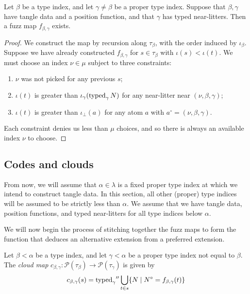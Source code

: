 \begin{proposition}
    Let \( \beta \) be a type index, and let \( \gamma \neq \beta \) be a proper type index.
    Suppose that \( \beta, \gamma \) have tangle data and a position function, and that \( \gamma \) has typed near-litters.
    Then a fuzz map \( f_{\beta,\gamma} \) exists.
\end{proposition}
\begin{proof}
    We construct the map by recursion along \( \tau_\beta \), with the order induced by \( \iota_\beta \).
    Suppose we have already constructed \( f_{\beta,\gamma} \) for \( s \in \tau_\beta \) with \( \iota(s) < \iota(t) \).
    We must choose an index \( \nu \in \mu \) subject to three constraints:
    \begin{enumerate}
        \item \( \nu \) was not picked for any previous \( s \);
        \item \( \iota(t) \) is greater than \( \iota_\gamma(\operatorname{typed}_\gamma N) \) for any near-litter near \( (\nu, \beta, \gamma) \);
        \item \( \iota(t) \) is greater than \( \iota_\bot(a) \) for any atom \( a \) with \( a^\circ = (\nu, \beta, \gamma) \).
    \end{enumerate}
    Each constraint denies us less than \( \mu \) choices, and so there is always an available index \( \nu \) to choose.
\end{proof}

\subsection{Codes and clouds}

From now, we will assume that \( \alpha \in \lambda \) is a fixed proper type index at which we intend to construct tangle data.
In this section, all other (proper) type indices will be assumed to be strictly less than \( \alpha \).
We assume that we have tangle data, position functions, and typed near-litters for all type indices below \( \alpha \).

We will now begin the process of stitching together the fuzz maps to form the function that deduces an alternative extension from a preferred extension.

\begin{definition}
    Let \( \beta < \alpha \) be a type index, and let \( \gamma < \alpha \) be a proper type index not equal to \( \beta \).
    The \emph{cloud map} \( c_{\beta,\gamma} : \mathcal P(\tau_\beta) \to \mathcal P(\tau_\gamma) \) is given by
    \[ c_{\beta,\gamma}(s) = {\operatorname{typed}_\gamma} '' \bigcup_{t \in s} \{ N \mid N^\circ = f_{\beta,\gamma}(t) \} \]
\end{definition}

